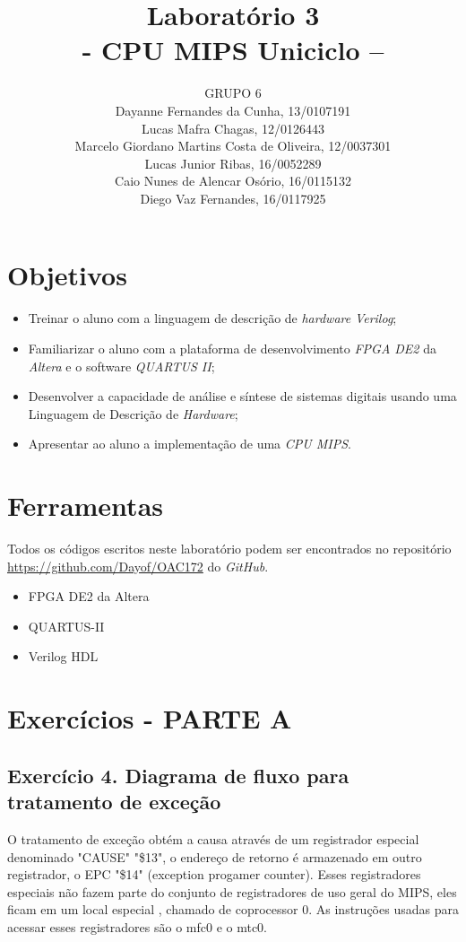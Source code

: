 \documentclass[12pt]{article}
\title{Laboratório 3\\- CPU MIPS Uniciclo –}
\author{GRUPO 6\\
	Dayanne Fernandes da Cunha, 13/0107191\\
	Lucas Mafra Chagas, 12/0126443\\
	Marcelo Giordano Martins Costa de Oliveira, 12/0037301\\
	Lucas Junior Ribas, 16/0052289\\
	Caio Nunes de Alencar Osório, 16/0115132\\
	Diego Vaz Fernandes, 16/0117925}
\begin{document}
\maketitle

\section{Objetivos}
\label{sec:Objetivos}

\begin{itemize}
\item Treinar o aluno com a linguagem de descrição de \textit{hardware} \textit{Verilog};
\item Familiarizar o aluno com a plataforma de desenvolvimento \textit{FPGA DE2} da \textit{Altera} e o software \textit{QUARTUS II};
\item Desenvolver a capacidade de análise e síntese de sistemas digitais usando uma Linguagem de Descrição de \textit{Hardware};
\item Apresentar ao aluno a implementação de uma \textit{CPU MIPS}.
\end{itemize}

\section{Ferramentas}
\label{sec:Materiais}

Todos os códigos escritos neste laboratório podem ser encontrados no repositório \url{https://github.com/Dayof/OAC172} do \textit{GitHub}.

\begin{itemize}
\item FPGA DE2 da Altera 
\item QUARTUS-II
\item Verilog HDL
\end{itemize}

\section{Exercícios - PARTE A}
\label{sec:exerciciosA}

\subsection{Exercício 4. Diagrama de fluxo para tratamento de exceção}
\label{subsec:dfluxoexc}

  O tratamento de exceção obtém a causa através de um registrador especial denominado "CAUSE" "\$13", o endereço de retorno é armazenado em outro registrador, o EPC "\$14" (exception progamer counter). Esses registradores especiais não fazem parte do conjunto de registradores de uso geral do MIPS, eles ficam em um local especial , chamado de coprocessor 0. As instruções usadas para acessar esses registradores são o mfc0 e o mtc0.
	  
\end{document}
